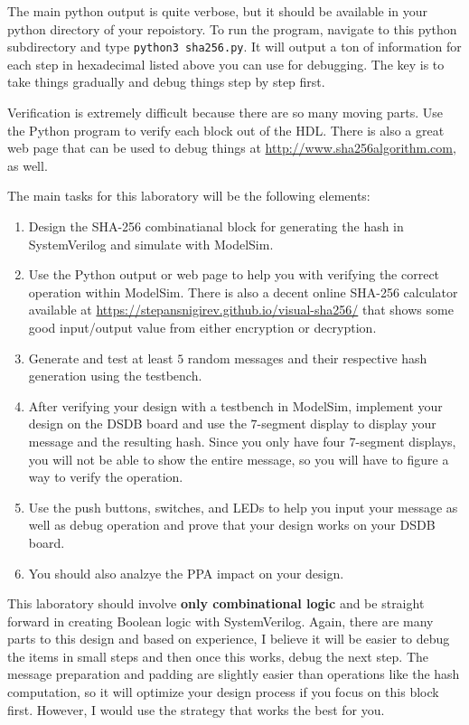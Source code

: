 \documentclass{article}
\begin{document}
The main python output is quite verbose, but it should be available in
your python directory of your repoistory.  To run the program,
navigate to this python subdirectory and type
\verb!python3 sha256.py!.  It will output a ton of information for
each step in hexadecimal listed above you can use for debugging.  The
key is to take things gradually and debug things step by step first.  

Verification is extremely difficult
because there are so many moving parts.  Use the
Python program to verify each block out of the HDL.  There is also a
great web page that can be used to debug things at
\url{http://www.sha256algorithm.com}, as well.

The main tasks for this laboratory
will be the following elements:
\begin{enumerate}
  \item Design the SHA-256 combinatianal block for generating the hash
    in SystemVerilog and simulate with ModelSim.
  \item Use the Python output or web page to help you with verifying the
    correct operation within ModelSim.
    There is also a decent online
    SHA-256 calculator available at \url{https://stepansnigirev.github.io/visual-sha256/} that
    shows some good input/output value from either encryption or decryption.  
  \item Generate and test at least $5$ random messages and their respective hash generation
    using the testbench.
  \item After verifying your design with a testbench in ModelSim,
    implement your design on the DSDB board and use the    
    $7$-segment display to display your message and the resulting hash.
    Since you only have four $7$-segment displays, you will not be
    able to show the entire message, so you will
    have to figure a way to verify the operation.
  \item Use the push buttons, switches, and LEDs to help you input
    your message as well as debug operation and prove that your
    design works on your DSDB board.
    \item You should also analzye the PPA impact on your design. 
\end{enumerate}
This laboratory should involve \textbf{only combinational logic} and be
straight forward in creating Boolean logic with SystemVerilog.
Again, there are many parts to this design and based on experience, I
believe it will be easier to debug the items in small steps and then
once this works, debug the next step.  The message preparation and
padding are slightly easier than operations like the hash computation,
so it will optimize your design process if you focus on this block
first.  However, I would use the strategy that works the best for you.
\end{document}
